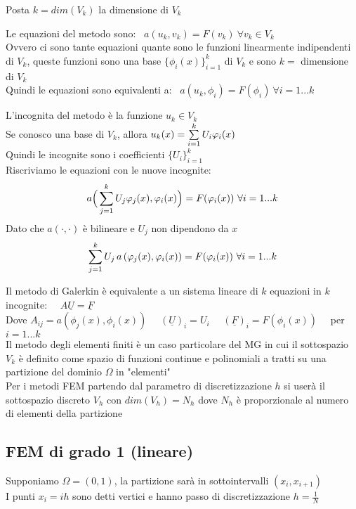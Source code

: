 \documentclass{article}
\newcommand{\om}{\Omega}
\renewcommand{\vv}[1]{\underline{#1}}
\begin{document}
Posta $k=dim(V_k)$ la dimensione di $V_k$

Le equazioni del metodo sono: \ $a(u_k,v_k)=F(v_k) \ \forall v_k\in V_k$\\
Ovvero ci sono tante equazioni quante sono le funzioni linearmente indipendenti di $V_k$, queste funzioni sono una base $\{\phi_i(x)\}_{i=1}^k$ di $V_k$ e sono $k=$ dimensione di $V_k$\\
Quindi le equazioni sono equivalenti a:  \ $a(u_k,\phi_i)=F(\phi_i) \ \forall i=1...k$

L'incognita del metodo è la funzione $u_k\in V_k$\\
Se conosco una base di $V_k$, allora $u_k(x)= \sum\limits_{i=1}^{k} U_i\varphi_i(x)$\\
Quindi le incognite sono i coefficienti $\{U_i\}_{i=1}^{k}$\\

Riscriviamo le equazioni con le nuove incognite:
\[
a\Big( \sum\limits_{j=1}^{k} U_j\varphi_j(x), \varphi_i(x) \Big) = F(\varphi_i(x)) \ \forall i=1...k
\]
Dato che $a(\cdot,\cdot)$ è bilineare e $U_j$ non dipendono da $x$
\[
\sum\limits_{j=1}^{k} U_j\,a\left( \varphi_j(x), \varphi_i(x) \right) = F(\varphi_i(x)) \ \forall i=1...k
\]

Il metodo di Galerkin è equivalente a un sistema lineare di $k$ equazioni in $k$ incognite: \ \ $A \vv{U}=\vv{F}$\\
Dove $A_{ij}=a(\phi_j(x),\phi_i(x))$ \ \ $(\vv{U})_i=U_i$ \ \ $(\vv{F})_i= F(\phi_i(x))$ \ \ per $i=1...k$\\


Il metodo degli elementi finiti è un caso particolare del MG in cui il sottospazio $V_k$ è definito come spazio di funzioni continue e polinomiali a tratti su una partizione del dominio $\om$ in "elementi"\\

Per i metodi FEM partendo dal parametro di discretizzazione $h$ si userà il sottospazio discreto $V_h$ con $dim(V_h)=N_h$ dove $N_h$ è proporzionale al numero di elementi della partizione\\




\subsection{FEM di grado 1 (lineare)}


Supponiamo $\om=(0,1)$, la partizione sarà in sottointervalli $(x_i,x_{i+1})$\\
I punti $x_i=ih$ sono detti vertici e hanno passo di discretizzazione $h=\frac{1}{N}$\\
\end{document}
